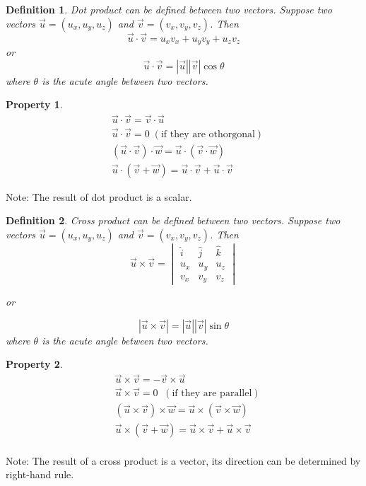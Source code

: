 \documentclass{article}
\newtheorem{definition}{Definition}
\newtheorem*{property}{Property}
\begin{document}
\begin{definition}
	Dot product can be defined between two vectors. Suppose two vectors $\vec{u}=(u_x,u_y,u_z)$ and $\vec{v}=(v_x,v_y,v_z)$. Then
	\[ \vec{u}\cdot\vec{v} = u_xv_x + u_yv_y + u_zv_z \]
	or 
	\[ \vec{u}\cdot\vec{v} = |\vec{u}||\vec{v}|\cos\theta \]
	where $\theta$ is the acute angle between two vectors.
\end{definition}

\begin{property}
	\begin{align}
	&\vec{u}\cdot\vec{v} = \vec{v}\cdot\vec{u}\\
	&\vec{u}\cdot\vec{v} = 0 \;(\text{if they are othorgonal})\\
	&(\vec{u}\cdot\vec{v})\cdot\vec{w} = \vec{u}\cdot(\vec{v}\cdot\vec{w})\\
	&\vec{u}\cdot(\vec{v}+\vec{w}) = \vec{u}\cdot\vec{v} + \vec{u}\cdot\vec{v}
	\end{align}
\end{property}

Note: The result of dot product is a scalar.

\begin{definition}
	Cross product can be defined between two vectors. Suppose two vectors $\vec{u}=(u_x,u_y,u_z)$ and $\vec{v}=(v_x,v_y,v_z)$. Then
	\[ \vec{u}\times\vec{v} = \begin{vmatrix}
	\hat{i} & \hat{j} & \hat{k}\\ u_x&u_y&u_z\\ v_x&v_y&v_z
	\end{vmatrix} \]
	
	or
	
	\[ |\vec{u}\times\vec{v}| = |\vec{u}||\vec{v}|\sin\theta \]
	where $\theta$ is the acute angle between two vectors.
\end{definition}

\begin{property}
	\begin{align}
	&\vec{u}\times\vec{v} = -\vec{v}\times\vec{u}\\
	&\vec{u}\times\vec{v} = 0\;\;(\text{if they are parallel})\\
	&(\vec{u}\times\vec{v})\times\vec{w} = \vec{u}\times(\vec{v}\times\vec{w})\\
	&\vec{u}\times(\vec{v} + \vec{w}) = \vec{u}\times\vec{v} + \vec{u}\times\vec{v}\\
	\end{align}
	
\end{property}

Note: The result of a cross product is a vector, its direction can be determined by right-hand rule.
\end{document}
